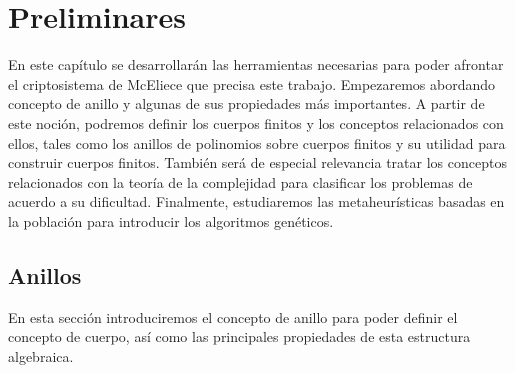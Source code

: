 

\chapter{Preliminares}

En este capítulo se desarrollarán las herramientas necesarias para poder afrontar el criptosistema de McEliece que precisa este trabajo. Empezaremos abordando concepto de anillo y algunas de sus propiedades más importantes. A partir de este noción, podremos definir los cuerpos finitos y los conceptos relacionados con ellos, tales como los anillos de polinomios sobre cuerpos finitos y su utilidad para construir cuerpos finitos. También será de especial relevancia tratar los conceptos relacionados con la teoría de la complejidad para clasificar los problemas de acuerdo a su dificultad. Finalmente, estudiaremos las metaheurísticas basadas en la población para introducir los algoritmos genéticos.

\section{Anillos}

En esta sección introduciremos el concepto de anillo para poder definir el concepto de cuerpo, así como las principales propiedades de esta estructura algebraica.

